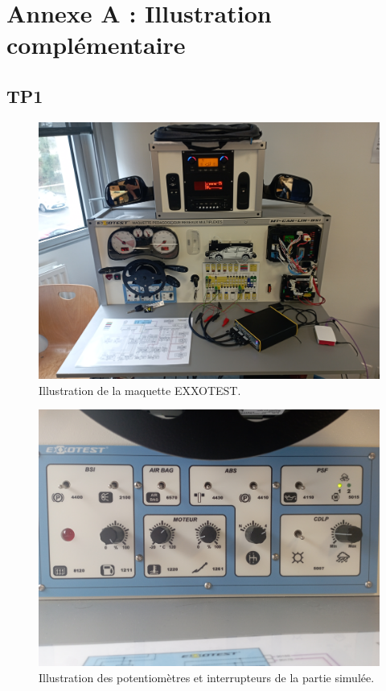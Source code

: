 \documentclass{rapportECC}
\begin{document}

\pagebreak

\appendix

\section{Annexe A : Illustration complémentaire}\label{sec:annexeA}

\subsection{TP1}

\begin{figure}[H]
    \centering
    \includegraphics[width=.7\textwidth]{./images/maquette.jpg}
    \caption{Illustration de la maquette EXXOTEST.}
    \label{fig:maquette_EXXOTEST}
\end{figure}

\begin{figure}[H]
    \centering
    \includegraphics[width=.7\textwidth]{./images/potentiometres_simu.jpg}
    \caption{Illustration des potentiomètres et interrupteurs de la partie simulée.}
    \label{fig:potentiometres}
\end{figure}
\end{document}
